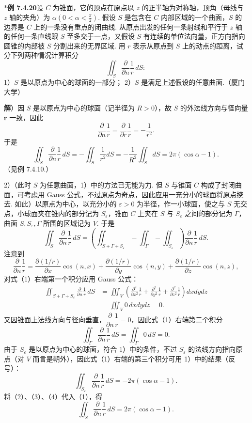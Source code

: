 \documentclass[UTF8, 12pt, fontset=fandol, oneside]{ctexart}
\begin{document}
\noindent\textbf{$*$例 7.4.20}\quad 设 $C$ 为锥面，它的顶点在原点以 $z$ 的正半轴为对称轴，顶角（母线与 $z$ 轴的夹角）为 $\alpha(0<\alpha<\frac\pi2)$. 假设 $S$ 是包含在 $C$ 内部区域的一个曲面，$S$ 的边界是 $C$ 上的一条没有重点的闭曲线. 从原点出发的任何一条射线和平行于 $z$ 轴的任何一条直线跟 $S$ 至多交于一点，又假设 $S$ 有连续的单位法向量，正方向指向圆锥的内部被 $S$ 分割出来的无界区域. 用 $r$ 表示从原点到 $S$ 上的动点的距离，试分下列两种情况计算积分
\[
\iint_S\frac{\partial}{\partial n}\frac1r\,dS:
\]
1）$S$ 是以原点为中心的球面的一部分；
2）$S$ 是满足上述假设的任意曲面.（厦门大学）

\noindent\textbf{解}）因 $S$ 是以原点为中心的球面（记半径为 $R>0$），故 $S$ 的外法线方向与径向量 $\mathbf r$ 一致，因此
\[
\frac{\partial}{\partial n}\frac1r=\frac{\partial}{\partial r}\frac1r=-\frac1{r^2}.
\]
于是
\[
\iint_S\frac{\partial}{\partial n}\frac1r\,dS
=-\iint_S\frac1{r^2}dS=-\frac1{R^2}\iint_SdS=2\pi(\cos\alpha-1).
\]
（见例 7.4.10.）

2）（此时 $S$ 为任意曲面，1）中的方法已无能为力. 但 $S$ 与锥面 $C$ 构成了封闭曲面，可考虑用 Gauss 公式，不过原点为奇点，因此应用一充分小的球面将原点挖去. 如此）以原点为中心，以充分小的 $\varepsilon>0$ 为半径，作一小球面，使之与 $S$ 无交点，小球面夹在锥内的部分记为 $S_\varepsilon$，锥面 $C$ 上夹在 $S$ 与 $S_\varepsilon$ 之间的部分记为 $\Gamma$，曲面 $S,S_\varepsilon,\Gamma$ 所围的区域记为 $V$. 于是
\begin{equation}
\iint_S\frac{\partial}{\partial n}\frac1r\,dS
=\left(\iint_{S+\Gamma+S_\varepsilon}-\iint_\Gamma-\iint_{S_\varepsilon}\right)\frac{\partial}{\partial n}\frac1r\,dS.
\tag{1}
\end{equation}
注意到
\[
\frac{\partial}{\partial n}\frac1r
=\frac{\partial(1/r)}{\partial x}\cos(n,x)
+\frac{\partial(1/r)}{\partial y}\cos(n,y)
+\frac{\partial(1/r)}{\partial z}\cos(n,z),
\]
对式（1）右端第一个积分应用 Gauss 公式：
\begin{equation}
\begin{aligned}
\iint_{S+\Gamma+S_\varepsilon}\frac{\partial}{\partial n}\frac1r\,dS
&=\iiint_V\left(\frac{\partial^2}{\partial x^2}\frac1r+\frac{\partial^2}{\partial y^2}\frac1r+\frac{\partial^2}{\partial z^2}\frac1r\right)dxdydz\\
&=\iiint_V0\,dxdydz=0.
\end{aligned}
\tag{2}
\end{equation}
又因锥面上法线方向与径向垂直，$\dfrac{\partial}{\partial n}\dfrac1r=0$，因此式（1）右端第二个积分
\begin{equation}
\iint_\Gamma\frac{\partial}{\partial n}\frac1r\,dS=\iint_\Gamma0\,dS=0.
\tag{3}
\end{equation}
由于 $S_\varepsilon$ 是以原点为中心的球面，符合 1）中的条件，不过 $S_\varepsilon$ 的法线方向指向原点（对 $V$ 而言是朝外），因此式（1）右端的第三个积分可用 1）中的结果（反号）：
\begin{equation}
\iint_{S_\varepsilon}\frac{\partial}{\partial n}\frac1r\,dS=-2\pi(\cos\alpha-1).
\tag{4}
\end{equation}
将（2）、（3）、（4）代入（1），得
\[
\iint_S\frac{\partial}{\partial n}\frac1r\,dS=2\pi(\cos\alpha-1).
\]
\end{document}
